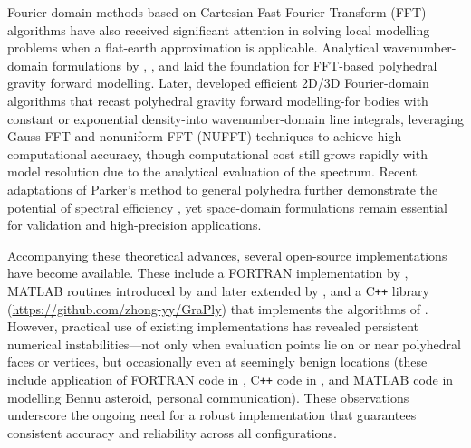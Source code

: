 \documentclass{seg}
\begin{document}
Fourier-domain methods based on Cartesian Fast Fourier Transform (FFT) algorithms have also received significant attention in solving local modelling problems when a flat-earth approximation is applicable. Analytical wavenumber-domain formulations by \citet{Pedersen1978Geophysics}, \citet{1983WuXZ_CJG}, and \citet{Hansen1988Geophysics} laid the foundation for FFT-based polyhedral gravity forward modelling. Later, \citet{Wu2019JGeod,Wu2019JGeoda} developed efficient 2D/3D Fourier-domain algorithms that recast polyhedral gravity forward modelling-for bodies with constant or exponential density-into wavenumber-domain line integrals, leveraging Gauss-FFT \citep{Wu2014Geophysics} and nonuniform FFT (NUFFT) \citep{Greengard2004SIAMRev.,Keiner2009ACMTrans.Math.Softw.} techniques to achieve high computational accuracy, though computational cost still grows rapidly with model resolution due to the analytical evaluation of the spectrum. Recent adaptations of Parker's method to general polyhedra further demonstrate the potential of spectral efficiency \cite{Wu2021J.Geophys.Res.SolidEarth}, yet space-domain formulations remain essential for validation and high-precision applications.

Accompanying these theoretical advances, several open-source implementations have become available. These include a FORTRAN implementation by \citet{Tsoulis2012Geophysics}, MATLAB routines introduced by \citet{Singh2001Geophysics} and later extended by \citet{Saraswati2019JGeod}, and a C\texttt{++} library (\url{https://github.com/zhong-yy/GraPly}) that implements the algorithms of \citet{Ren2017SurvGeophys,Ren2018GEOPHYSICS,Ren2020SurvGeophys,Ren2022GeophysicalResearchLetters}. However, practical use of existing implementations has revealed persistent numerical instabilities—not only when evaluation points lie on or near polyhedral faces or vertices, but occasionally even at seemingly benign locations (these include application of \citet{Tsoulis2012Geophysics} FORTRAN code in \citet{Wu2016Geophys.J.Int.}, \citet{Ren2018GEOPHYSICS} C\texttt{++} code in \citet{Zhou2020Geophysics}, and \citet{Saraswati2019JGeod} MATLAB code in modelling Bennu asteroid, personal communication). These observations underscore the ongoing need for a robust implementation that guarantees consistent accuracy and reliability across all configurations.
\end{document}
